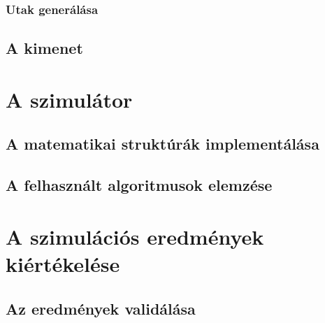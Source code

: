       \subsubsection{Utak generálása}
    \subsection{A kimenet}

  \section{A szimulátor} %
    \subsection{A matematikai struktúrák implementálása}
    \subsection{A felhasznált algoritmusok elemzése}

  \section{A szimulációs eredmények kiértékelése} %
    \subsection{Az eredmények validálása}
